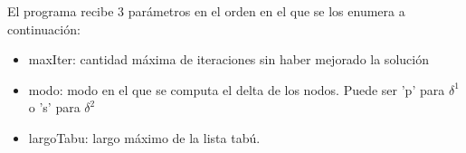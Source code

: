 El programa recibe 3 parámetros en el orden en el que se los enumera a continuación:
\begin{itemize}
 \item maxIter: cantidad máxima de iteraciones sin haber mejorado la solución
  \item modo: modo en el que se computa el delta de los nodos. Puede ser 'p' para $\delta^1$ o 's' para $\delta^2$
  \item largoTabu: largo máximo de la lista tabú.
\end{itemize}
